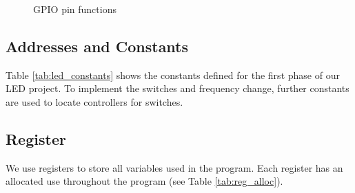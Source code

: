 \documentclass[11pt]{article}
\begin{document}
\begin{figure}[ht]
    \centering
    \scalebox{0.6}{}
    \caption{GPIO pin functions}
    \label{fig:gpio}
\end{figure}

\subsection{Addresses and Constants}

Table \ref{tab:led_constants} shows the constants defined for the first phase of our LED project. To implement the switches and frequency change, further constants are used to locate controllers for switches.

\begin{table}[ht]
    \centering
    \caption{Constants defined in \texttt{led\_blink.s} (partial)}
    \label{tab:led_constants}
\end{table}

\subsection{Register}

We use registers to store all variables used in the program. Each register has an allocated use throughout the program (see Table \ref{tab:reg_alloc}).

\begin{table}[ht]
    \centering
    \caption{Register allocation}
    \label{tab:reg_alloc}
\end{table}
\end{document}
